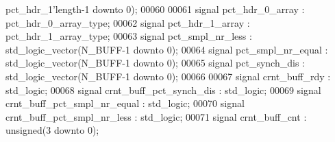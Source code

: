 \begin{DoxyCode}
{      pct_hdr_1}\textcolor{vhdlchar}{'}\textcolor{vhdlkeyword}{length}\textcolor{vhdlchar}{-}\textcolor{vhdllogic}{}\textcolor{vhdllogic}{1} \textcolor{keywordflow}{downto} \textcolor{vhdllogic}{}\textcolor{vhdllogic}{0}\textcolor{vhdlchar}{)};
00060 
00061 \textcolor{keywordflow}{signal} \textcolor{vhdlchar}{pct_hdr_0_array}              \textcolor{vhdlchar}{:} \textcolor{vhdlchar}{pct_hdr_0_array_type};
00062 \textcolor{keywordflow}{signal} \textcolor{vhdlchar}{pct_hdr_1_array}              \textcolor{vhdlchar}{:} \textcolor{vhdlchar}{pct_hdr_1_array_type};
00063 \textcolor{keywordflow}{signal} \textcolor{vhdlchar}{pct_smpl_nr_less}             \textcolor{vhdlchar}{:} \textcolor{comment}{std\_logic\_vector}\textcolor{vhdlchar}{(}\textcolor{vhdlchar}{N_BUFF}\textcolor{vhdlchar}{-}\textcolor{vhdllogic}{}\textcolor{vhdllogic}{1} \textcolor{keywordflow}{downto} \textcolor{vhdllogic}{}\textcolor{vhdllogic}{0}\textcolor{vhdlchar}{)};
00064 \textcolor{keywordflow}{signal} \textcolor{vhdlchar}{pct_smpl_nr_equal}            \textcolor{vhdlchar}{:} \textcolor{comment}{std\_logic\_vector}\textcolor{vhdlchar}{(}\textcolor{vhdlchar}{N_BUFF}\textcolor{vhdlchar}{-}\textcolor{vhdllogic}{}\textcolor{vhdllogic}{1} \textcolor{keywordflow}{downto} \textcolor{vhdllogic}{}\textcolor{vhdllogic}{0}\textcolor{vhdlchar}{)};
00065 \textcolor{keywordflow}{signal} \textcolor{vhdlchar}{pct_synch_dis}                \textcolor{vhdlchar}{:} \textcolor{comment}{std\_logic\_vector}\textcolor{vhdlchar}{(}\textcolor{vhdlchar}{N_BUFF}\textcolor{vhdlchar}{-}\textcolor{vhdllogic}{}\textcolor{vhdllogic}{1} \textcolor{keywordflow}{downto} \textcolor{vhdllogic}{}\textcolor{vhdllogic}{0}\textcolor{vhdlchar}{)};
00066 
00067 \textcolor{keywordflow}{signal} \textcolor{vhdlchar}{crnt_buff_rdy}                \textcolor{vhdlchar}{:} \textcolor{comment}{std\_logic};
00068 \textcolor{keywordflow}{signal} \textcolor{vhdlchar}{crnt_buff_pct_synch_dis}      \textcolor{vhdlchar}{:} \textcolor{comment}{std\_logic};
00069 \textcolor{keywordflow}{signal} \textcolor{vhdlchar}{crnt_buff_pct_smpl_nr_equal}  \textcolor{vhdlchar}{:} \textcolor{comment}{std\_logic}; 
00070 \textcolor{keywordflow}{signal} \textcolor{vhdlchar}{crnt_buff_pct_smpl_nr_less}   \textcolor{vhdlchar}{:} \textcolor{comment}{std\_logic}; 
00071 \textcolor{keywordflow}{signal} \textcolor{vhdlchar}{crnt_buff_cnt}                \textcolor{vhdlchar}{:} \textcolor{comment}{unsigned}\textcolor{vhdlchar}{(}\textcolor{vhdllogic}{}\textcolor{vhdllogic}{3} \textcolor{keywordflow}{downto} \textcolor{vhdllogic}{}\textcolor{vhdllogic}{0}\textcolor{vhdlchar}{)};

\end{DoxyCode}
